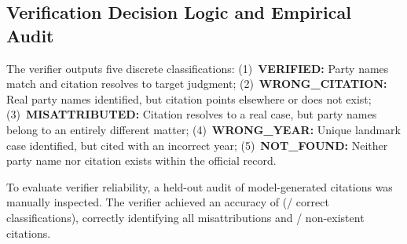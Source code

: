 \documentclass[conference]{IEEEtran}
\begin{document}
\subsection{Verification Decision Logic and Empirical Audit}
\label{sec:audit}
The verifier outputs five discrete classifications: (1)~\textbf{VERIFIED:} Party names match and citation resolves to target judgment; (2)~\textbf{WRONG\_CITATION:} Real party names identified, but citation points elsewhere or does not exist; (3)~\textbf{MISATTRIBUTED:} Citation resolves to a real case, but party names belong to an entirely different matter; (4)~\textbf{WRONG\_YEAR:} Unique landmark case identified, but cited with an incorrect year; (5)~\textbf{NOT\_FOUND:} Neither party name nor citation exists within the official record.

To evaluate verifier reliability, a held-out audit of \AuditN{} model-generated citations was manually inspected. The verifier achieved an accuracy of \AuditPct{} (\AuditCorrect/\AuditN{} correct classifications), correctly identifying all \AuditMisCorrect{} misattributions and \AuditNFCorrect/\AuditNFN{} non-existent citations.
\end{document}
